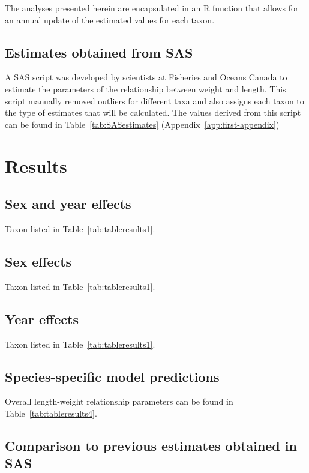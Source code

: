 \documentclass[12pt]{article}\usepackage[]{graphicx}\usepackage[]{color}
\begin{document}
The analyses presented herein are encapsulated in an R function that allows for an annual update of the estimated values for each taxon.

\subsection{Estimates obtained from SAS}\label{estimates-obtained-from-sas}

A SAS script was developed by scientists at Fisheries and Oceans Canada to estimate the parameters of the relationship between weight and length. This script manually removed outliers for different taxa and also assigns each taxon to the type of estimates that will be calculated. The values derived from this script can be found in Table~\ref{tab:SASestimates} (Appendix~\ref{app:first-appendix})

\section{Results}\label{results}

\subsection{Sex and year effects}\label{sex-and-year-effects}

Taxon listed in Table~\ref{tab:tableresults1}.

\subsection{Sex effects}\label{sex-effects}

Taxon listed in Table~\ref{tab:tableresults1}.

\subsection{Year effects}\label{year-effects}

Taxon listed in Table~\ref{tab:tableresults1}.

\subsection{Species-specific model predictions}\label{species-specific-model-predictions}

Overall length-weight relationship parameters can be found in Table~\ref{tab:tableresults4}.

\subsection{Comparison to previous estimates obtained in SAS}\label{comparison-to-previous-estimates-obtained-in-sas}
\end{document}
